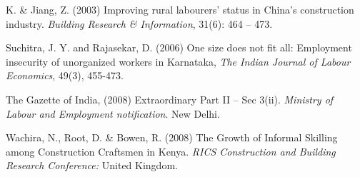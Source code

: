\documentclass[12pt]{report}
\begin{document}
\begin{description}
		\item K.  \&  Jiang,  Z.  (2003)  Improving  rural  labourers'  status  in  China's construction industry.  \textit{Building  Research  \&  Information},  31(6):  464  –  473.
		
		\item Suchitra,  J.  Y.  and  Rajasekar,  D.  (2006)  One  size  does  not  fit  all:  Employment  insecurity of  unorganized  workers  in  Karnataka,  \textit{The  Indian  Journal  of  Labour  Economics}, 49(3),  455-473.\\ 
		
		\item The  Gazette  of  India,  (2008)  Extraordinary  Part  II  –  Sec  3(ii).  \textit{Ministry  of  Labour  and Employment  notification}.  New  Delhi. \\
		
		\item Wachira,  N.,  Root,  D.  \&  Bowen,  R.  (2008)  The  Growth  of  Informal  Skilling  among Construction  Craftsmen  in  Kenya.  \textit{RICS  Construction  and  Building  Research Conference:}  United  Kingdom. 
	\end{description}
	
	
	
	
	
	
	
	
	
	
	
	
	
	
	
	
	
	
	
	
	
	
	
	
	
	
	
	
	
	
	
	
	
	
	
	
	
	
	
	
	
	
	
	
\end{document}
